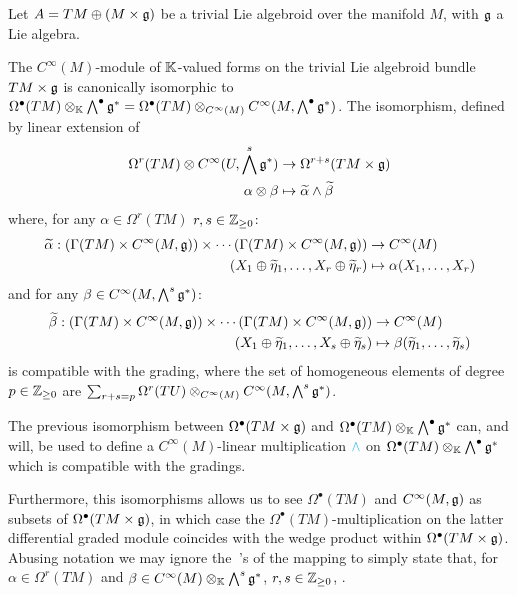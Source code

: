 Let $A = TM \oplus (M \times \mathfrak{g})$ be a trivial Lie algebroid over the manifold $M$, with $\mathfrak{g}$ a Lie algebra.

\begin{proposition}\label{propIsoScalarFormsTLA}
The $C^\infty(M)$-module of $\mathbb{K}$-valued forms on the trivial Lie algebroid bundle $TM \times \mathfrak{g}$ is canonically isomorphic to $\Omega^\bullet(TM) \otimes_{\mathbb{K}} \bigwedge^\bullet \mathfrak{g}^* = \Omega^\bullet(TM) \otimes_{C^\infty(M)} C^\infty(M, \bigwedge^\bullet \mathfrak{g}^*)$. The isomorphism, defined by linear extension of
\begin{align*}
    \Omega^r(TM) \otimes C^\infty(U, \bigwedge^s \mathfrak{g}^*) &\to \Omega^{r+s}(TM \times \mathfrak{g})\\
    \alpha \otimes \beta &\mapsto \widetilde \alpha \wedge \widetilde \beta
\end{align*} where, for any $\alpha \in \Omega^r(TM)$ $r, s \in \mathbb{Z}_{\geq 0}$:
\begin{align*}
    \widetilde \alpha: (\Gamma(TM) \times C^\infty(M, \mathfrak{g})) \times \cdots (\Gamma(TM) \times C^\infty(M, \mathfrak{g})) &\to C^\infty(M) \\
    (X_1 \oplus \widetilde \eta_1, \dots, X_r \oplus \widetilde \eta_r) &\mapsto \alpha(X_1, \dots, X_r)
\end{align*} and for any $\beta \in C^\infty(M, \bigwedge^s \mathfrak{g}^*)$:
\begin{align*}
    \widetilde \beta: (\Gamma(TM) \times C^\infty(M, \mathfrak{g})) \times \cdots (\Gamma(TM) \times C^\infty(M, \mathfrak{g})) &\to C^\infty(M) \\
    (X_1 \oplus \widetilde \eta_1, \dots, X_s \oplus \widetilde \eta_s) &\mapsto \beta(\widetilde \eta_1, \dots, \widetilde \eta_s)
\end{align*}
is compatible with the grading, where the set of homogeneous elements of degree $p \in \mathbb{Z}_{\geq 0}$ are $\sum_{r + s = p} \Omega^r(TU) \otimes_{C^\infty(M)} C^\infty(M, \bigwedge^s \mathfrak{g}^*)$.
\end{proposition}

\begin{remark}
The previous isomorphism between $\Omega^\bullet(TM \times \mathfrak{g})$ and $\Omega^\bullet(TM) \otimes_{\mathbb{K}} \bigwedge^\bullet \mathfrak{g}^*$ can, and will, be used to define a $C^\infty(M)$-linear multiplication $\textcolor{cyan}{\wedge}$ on $\Omega^\bullet(TM) \otimes_{\mathbb{K}} \bigwedge^\bullet \mathfrak{g}^*$ which is compatible with the gradings. 

Furthermore, this isomorphisms allows us to see $\Omega^\bullet(TM)$ and $C^\infty(M, \mathfrak{g})$ as subsets of $\Omega^\bullet(TM \times \mathfrak{g})$, in which case the $\Omega^\bullet(TM)$-multiplication on the latter differential graded module coincides with the wedge product within $\Omega^\bullet(TM \times \mathfrak{g})$. Abusing notation we may ignore the $~$'s of the mapping to simply state that, for $\alpha \in \Omega^r(TM)$ and $\beta \in C^\infty(M)\otimes_{\mathbb{K}} \bigwedge^s \mathfrak{g}^*$, $r, s \in \mathbb{Z}_{\geq 0}$, . 
\end{remark}

